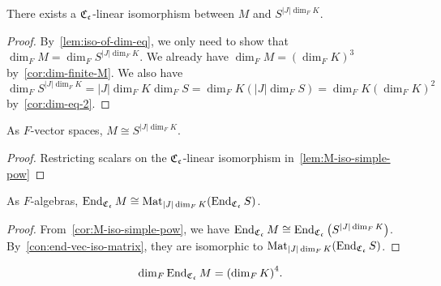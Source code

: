 \begin{lemma}\label{lem:M-iso-simple-pow}
  There exists a $\operatorname{\mathfrak{C}}_{\mathfrak{c}}$-linear isomorphism between $M$ and $S^{|J|\dim_{F}K}$.
  \leanok
\end{lemma}

\begin{proof}
  By~\cref{lem:iso-of-dim-eq}, we only need to show that $\dim_{F}M = \dim_{F}S^{|J|\dim_{F}K}$. We already have $\dim_{F}M = \left(\dim_{F}K\right)^{3}$ by~\cref{cor:dim-finite-M}. We also have $\dim_{F}S^{|J|\dim_{F}K} = |J|\dim_{F}K\dim_{F}S = \dim_{F}K \left(|J|\dim_{F}S\right) = \dim_{F}K\left(\dim_{F}K\right)^{2}$ by~\cref{cor:dim-eq-2}.
\end{proof}

\begin{corollary}\label{cor:M-iso-simple-pow}
  As $F$-vector spaces, $M \cong S^{|J|\dim_{F}K}$.
  \leanok
\end{corollary}
\begin{proof}
  Restricting scalars on the $\operatorname{\mathfrak{C}}_{\mathfrak{c}}$-linear isomorphism in~\cref{lem:M-iso-simple-pow}
\end{proof}

\begin{corollary}\label{cor:end-M-iso-mat}
  As $F$-algebras, $\operatorname{End}_{\operatorname{\mathfrak{C}}_{\mathfrak{c}}}M \cong \operatorname{Mat}_{|J|\dim_{F}K}(\operatorname{End}_{\operatorname{\mathfrak{C}}_{\mathfrak{c}}}S)$.
  \leanok
\end{corollary}
\begin{proof}
  From~\cref{cor:M-iso-simple-pow}, we have $\operatorname{End}_{\operatorname{\mathfrak{C}}_{\mathfrak{c}}}M\cong \operatorname{End}_{\operatorname{\mathfrak{C}}_{\mathfrak{c}}}\left(S^{|J|\dim_{F}K}\right)$. By~\cref{con:end-vec-iso-matrix}, they are isomorphic to $\operatorname{Mat}_{|J|\dim_{F}K}(\operatorname{End}_{\operatorname{\mathfrak{C}}_{\mathfrak{c}}}S)$.
\end{proof}

\begin{corollary}\label{cor:dim-eq-3}
  \[
    \dim_{F}\operatorname{End}_{\operatorname{\mathfrak{C}}_{\mathfrak{c}}}M = {\left(\dim_{F}K\right)}^{4}.
  \]
  \leanok
\end{corollary}

